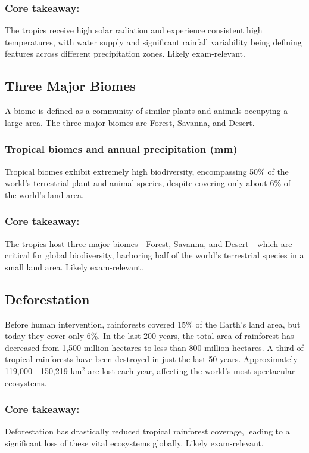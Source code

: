 \subsubsection*{Core takeaway:} 
The tropics receive high solar radiation and experience consistent high temperatures, with water supply and significant rainfall variability being defining features across different precipitation zones. Likely exam-relevant.


\subsection{Three Major Biomes} 
A biome is defined as a community of similar plants and animals occupying a large area. The three major biomes are Forest, Savanna, and Desert. 

\subsubsection{Tropical biomes and annual precipitation (mm)} Tropical biomes exhibit extremely high biodiversity, encompassing 50\% of the world’s terrestrial plant and animal species, despite covering only about 6\% of the world’s land area.

\subsubsection*{Core takeaway:} 
The tropics host three major biomes—Forest, Savanna, and Desert—which are critical for global biodiversity, harboring half of the world's terrestrial species in a small land area. Likely exam-relevant.


\subsection{Deforestation} 
Before human intervention, rainforests covered 15\% of the Earth's land area, but today they cover only 6\%. In the last 200 years, the total area of rainforest has decreased from 1,500 million hectares to less than 800 million hectares. A third of tropical rainforests have been destroyed in just the last 50 years. Approximately 119,000 - 150,219 km$^2$ are lost each year, affecting the world's most spectacular ecosystems.

\subsubsection*{Core takeaway: }
Deforestation has drastically reduced tropical rainforest coverage, leading to a significant loss of these vital ecosystems globally. Likely exam-relevant.


